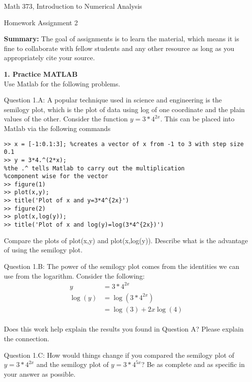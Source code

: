 \documentclass{article}
\def\ds{\displaystyle}
\begin{document}

\large

{\Large Math 373, Introduction to Numerical Analysis}


{\Large Homework Assignment 2} 

{\bf Summary:} {\color{red} The goal of assignments is to learn the material, which means it is fine to collaborate with fellow students and any other resource as long as you appropriately cite your source.}
\par \bigskip \par



{\bf  1. Practice MATLAB} \\
Use Matlab for the following problems. \par \medskip \noindent
%
Question 1.A: A popular technique used in science and engineering is the semilogy plot, which is the plot of data using log of one coordinate and the plain values of the other. Consider the function $\ds y=3*4^{2x}$. This can be placed into Matlab via the following commands
\begin{verbatim}
>> x = [-1:0.1:3]; %creates a vector of x from -1 to 3 with step size 0.1
>> y = 3*4.^(2*x); 
%the .^ tells Matlab to carry out the multiplication 
%component wise for the vector
>> figure(1)
>> plot(x,y);
>> title('Plot of x and y=3*4^{2x}')
>> figure(2)
>> plot(x,log(y));
>> title('Plot of x and log(y)=log(3*4^{2x})')    
\end{verbatim}
\par
Compare the plots of plot(x,y) and plot(x,log(y)). Describe what is the advantage of using the semilogy plot. 
\medskip \par \noindent
%
Question 1.B: The power of the semilogy plot comes from the identities we can use from the logarithm. Consider the following:
\begin{align*}
y &= 3*4^{2x}\\
\log (y) &= \log (3*4^{2x}) \\
 &= \log (3) + 2x \log(4)
\end{align*}
\\
Does this work help explain the results you found in Question A?  Please explain the connection. 

\medskip \par \noindent
%
Question 1.C: How would things change if you compared the semilogy plot of $\ds y = 3*4^{2x}$ and the semilogy plot of $\ds y = 3*4^{5x}$? Be as complete and as specific in your answer as possible.
\end{document}
